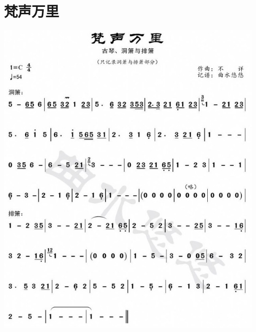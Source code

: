 \documentclass[cn,pad,twocol]{elegantbook}
\begin{document}
\section{梵声万里}
    \includegraphics[width=\textwidth]{dongxiao/20200901-梵声万里.jpeg}
\end{document}
